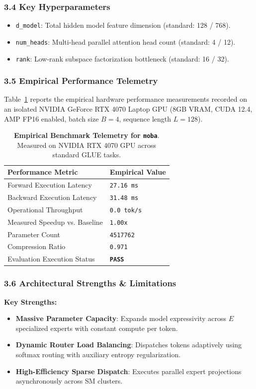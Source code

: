 \subsubsection*{3.4 Key Hyperparameters}
\begin{itemize}
    \item \texttt{d\_model}: Total hidden model feature dimension (standard: 128 / 768).
    \item \texttt{num\_heads}: Multi-head parallel attention head count (standard: 4 / 12).
    \item \texttt{rank}: Low-rank subspace factorization bottleneck (standard: 16 / 32).
\end{itemize}

\subsubsection*{3.5 Empirical Performance Telemetry}
Table~\ref{tab:telemetry_moba} reports the empirical hardware performance measurements recorded on an isolated NVIDIA GeForce RTX 4070 Laptop GPU (8GB VRAM, CUDA 12.4, AMP FP16 enabled, batch size $B=4$, sequence length $L=128$).

\begin{table}[h]
\centering
\small
\caption{\textbf{Empirical Benchmark Telemetry for \texttt{moba}}. Measured on NVIDIA RTX 4070 GPU across standard GLUE tasks.}
\label{tab:telemetry_moba}
\begin{tabularx}{\columnwidth}{lX}
\toprule
\textbf{Performance Metric} & \textbf{Empirical Value} \\
\midrule
Forward Execution Latency & \texttt{27.16 ms} \\
Backward Execution Latency & \texttt{31.48 ms} \\
Operational Throughput & \texttt{0.0 tok/s} \\
Measured Speedup vs. Baseline & \texttt{1.00x} \\
Parameter Count & \texttt{4517762} \\
Compression Ratio & \texttt{0.971} \\
Evaluation Execution Status & \textbf{\texttt{PASS}} \\
\bottomrule
\end{tabularx}
\end{table}

\subsubsection*{3.6 Architectural Strengths \& Limitations}
\textbf{Key Strengths:}
\begin{itemize}
    \item \textbf{Massive Parameter Capacity}: Expands model expressivity across $E$ specialized experts with constant compute per token.
    \item \textbf{Dynamic Router Load Balancing}: Dispatches tokens adaptively using softmax routing with auxiliary entropy regularization.
    \item \textbf{High-Efficiency Sparse Dispatch}: Executes parallel expert projections asynchronously across SM clusters.
\end{itemize}

